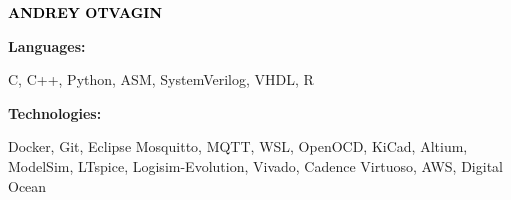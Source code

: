 \documentclass[9pt]{developercv} %
\begin{document}

\begin{minipage}[t]{0.5\textwidth}
	\vspace{-\baselineskip} %

	{ \fontsize{16}{20} \textcolor{black}{\textbf{\MakeUppercase{Andrey Otvagin}}}} %

	\vspace{6pt}
    \hspace{12pt}

    \hspace{12pt}

    \hspace{12pt}


\end{minipage}
\hfill
\begin{minipage}[t]{0.5\textwidth}
    \vspace{-18pt}
    \vspace{-6pt}

    \begin{minipage}[t]{0.2\textwidth}
        \textbf{Languages:}
    \end{minipage}
    \hfill
    \begin{minipage}[t]{0.73\textwidth}
        C, C++, Python, ASM, SystemVerilog, VHDL, R
    \end{minipage}
    \vspace{4mm}

    \begin{minipage}[t]{0.2\textwidth}
        \textbf{Technologies:}
    \end{minipage}
    \hfill
    \begin{minipage}[t]{0.73\textwidth}
        Docker, Git, Eclipse Mosquitto, MQTT, WSL, OpenOCD, KiCad, Altium, ModelSim, LTspice, Logisim-Evolution, Vivado, Cadence Virtuoso, AWS, Digital Ocean
    \end{minipage}

\end{minipage}
\end{document}
